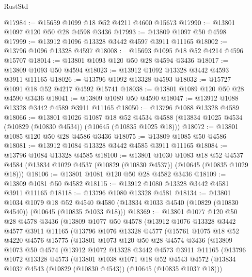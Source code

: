 \begin{lexlean}{RustStd}
\begin{coremodule}
@17984 := @15659 @1099 @18 @52 @4211 @4600 @15673
@17990 := @13801 @1097 @120 @50 @28 @4598 @3436
@17993 := @13809 @1097 @50 @4598
@17999 := @13912 @1096 @13328 @3442 @4597 @3911 @11165
@18002 := @13796 @1096 @13328 @4597
@18008 := @15693 @1095 @18 @52 @4214 @4596 @15707
@18014 := @13801 @1093 @120 @50 @28 @4594 @3436
@18017 := @13809 @1093 @50 @4594
@18023 := @13912 @1092 @13328 @3442 @4593 @3911 @11165
@18026 := @13796 @1092 @13328 @4593
@18032 := @15727 @1091 @18 @52 @4217 @4592 @15741
@18038 := @13801 @1089 @120 @50 @28 @4590 @3436
@18041 := @13809 @1089 @50 @4590
@18047 := @13912 @1088 @13328 @3442 @4589 @3911 @11165
@18050 := @13796 @1088 @13328 @4589
@18066 := @13801
    @1026
    @1087
    @18
    @52
    @4534
    @4588
    (@13834 @1025 @4534 (@10829 (@10830 @4534)) (@10645 (@10835 @1025 @18)))
@18072 := @13801 @1085 @120 @50 @28 @4586 @3436
@18075 := @13809 @1085 @50 @4586
@18081 := @13912 @1084 @13328 @3442 @4585 @3911 @11165
@18084 := @13796 @1084 @13328 @4585
@18100 := @13801
    @1030
    @1083
    @18
    @52
    @4537
    @4584
    (@13834 @1029 @4537 (@10829 (@10830 @4537)) (@10645 (@10835 @1029 @18)))
@18106 := @13801 @1081 @120 @50 @28 @4582 @3436
@18109 := @13809 @1081 @50 @4582
@18115 := @13912 @1080 @13328 @3442 @4581 @3911 @11165
@18118 := @13796 @1080 @13328 @4581
@18134 := @13801
    @1034
    @1079
    @18
    @52
    @4540
    @4580
    (@13834 @1033 @4540 (@10829 (@10830 @4540)) (@10645 (@10835 @1033 @18)))
@18369 := @13801
    @1077
    @120
    @50
    @28
    @4578
    @3436
    (@13809
      @1077
      @50
      @4578
      (@13912
        @1076
        @13328
        @3442
        @4577
        @3911
        @11165
        (@13796
          @1076
          @13328
          @4577
          (@15761
            @1075
            @18
            @52
            @4220
            @4576
            @15775
            (@13801
              @1073
              @120
              @50
              @28
              @4574
              @3436
              (@13809
                @1073
                @50
                @4574
                (@13912
                  @1072
                  @13328
                  @3442
                  @4573
                  @3911
                  @11165
                  (@13796
                    @1072
                    @13328
                    @4573
                    (@13801
                      @1038
                      @1071
                      @18
                      @52
                      @4543
                      @4572
                      (@13834 @1037 @4543 (@10829 (@10830 @4543)) (@10645 (@10835 @1037 @18)))

\end{coremodule}
\end{lexlean}
